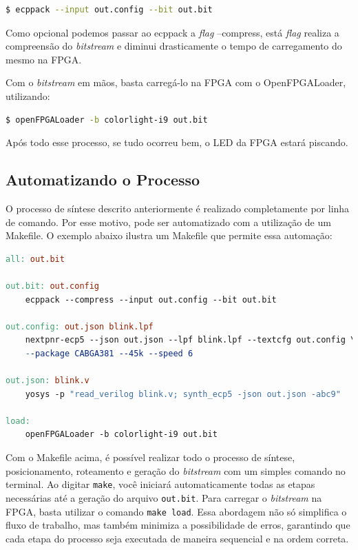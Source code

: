 \documentclass{report}
\begin{document}
\begin{lstlisting}[language=bash]
$ ecppack --input out.config --bit out.bit
\end{lstlisting}

Como opcional podemos passar ao ecppack a \textit{flag} --compress, está \textit{flag} realiza a compreensão do \textit{bitstream} e diminui drasticamente o tempo de carregamento do mesmo na FPGA.

Com o \textit{bitstream} em mãos, basta carregá-lo na FPGA com o OpenFPGALoader, utilizando:

\begin{lstlisting}[language=bash]
$ openFPGALoader -b colorlight-i9 out.bit
\end{lstlisting}

Após todo esse processo, se tudo ocorreu bem, o LED da FPGA estará piscando.

\subsection{Automatizando o Processo}

O processo de síntese descrito anteriormente é realizado completamente por linha de comando. Por esse motivo, pode ser automatizado com a utilização de um Makefile. O exemplo abaixo ilustra um Makefile que permite essa automação:

\begin{lstlisting}[language=Makefile, caption={Makefile para automatização do processo de síntese.}]
all: out.bit

out.bit: out.config
    ecppack --compress --input out.config --bit out.bit

out.config: out.json blink.lpf
    nextpnr-ecp5 --json out.json --lpf blink.lpf --textcfg out.config \
    --package CABGA381 --45k --speed 6

out.json: blink.v
    yosys -p "read_verilog blink.v; synth_ecp5 -json out.json -abc9"

load:
    openFPGALoader -b colorlight-i9 out.bit
\end{lstlisting}

Com o Makefile acima, é possível realizar todo o processo de síntese, posicionamento, roteamento e geração do \textit{bitstream} com um simples comando no terminal. Ao digitar \texttt{make}, você iniciará automaticamente todas as etapas necessárias até a geração do arquivo \texttt{out.bit}. Para carregar o \textit{bitstream} na FPGA, basta utilizar o comando \texttt{make load}. Essa abordagem não só simplifica o fluxo de trabalho, mas também minimiza a possibilidade de erros, garantindo que cada etapa do processo seja executada de maneira sequencial e na ordem correta.
\end{document}
